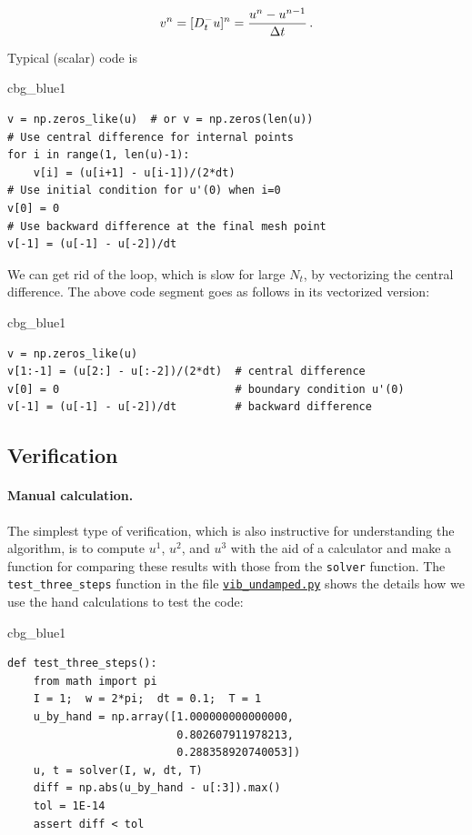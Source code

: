 \documentclass[%
oneside,                 %
final,                   %
10pt]{article}
\newenvironment{_cod_tight}[1]{
   \def\FrameCommand{\colorbox{#1}}
   \FrameRule0.6pt\MakeFramed {\FrameRestore}\vskip3mm}
   {\vskip0mm\endMakeFramed}
\newenvironment{cod}[1]{
\bgroup\rmfamily
\fboxsep=0mm\relax
\begin{_cod_tight}{#1}
\list{}{\parsep=-2mm\parskip=0mm\topsep=0pt\leftmargin=2mm
\rightmargin=2\leftmargin\leftmargin=4pt\relax}
\item\relax}
{\endlist\end{_cod_tight}\egroup}
\begin{document}
\[ v^n=[D_t^-u]^n = \frac{u^{n} - u^{n-1}}{\Delta t}\tp\]

Typical (scalar) code is

\begin{cod}{cbg_blue1}\begin{Verbatim}[numbers=none,fontsize=\fontsize{9pt}{9pt},baselinestretch=0.95,xleftmargin=2mm]
v = np.zeros_like(u)  # or v = np.zeros(len(u))
# Use central difference for internal points
for i in range(1, len(u)-1):
    v[i] = (u[i+1] - u[i-1])/(2*dt)
# Use initial condition for u'(0) when i=0
v[0] = 0
# Use backward difference at the final mesh point
v[-1] = (u[-1] - u[-2])/dt
\end{Verbatim}
\end{cod}
\noindent
We can get rid of the loop, which is slow for large $N_t$, by
vectorizing the central difference. The above code segment
goes as follows in its vectorized version:

\begin{cod}{cbg_blue1}\begin{Verbatim}[numbers=none,fontsize=\fontsize{9pt}{9pt},baselinestretch=0.95,xleftmargin=2mm]
v = np.zeros_like(u)
v[1:-1] = (u[2:] - u[:-2])/(2*dt)  # central difference
v[0] = 0                           # boundary condition u'(0)
v[-1] = (u[-1] - u[-2])/dt         # backward difference
\end{Verbatim}
\end{cod}
\noindent


\subsection{Verification}
\label{vib:ode1:verify}

\paragraph{Manual calculation.}
The simplest type of verification, which is also instructive for understanding
the algorithm, is to compute $u^1$, $u^2$, and $u^3$
with the aid of a calculator
and make a function for comparing these results with those from the \texttt{solver}
function. The \Verb!test_three_steps! function in
the file \href{{http://tinyurl.com/nm5587k/vib/vib_undamped.py}}{\nolinkurl{vib_undamped.py}}
shows the details how we use the hand calculations to test the code:

\begin{cod}{cbg_blue1}\begin{Verbatim}[numbers=none,fontsize=\fontsize{9pt}{9pt},baselinestretch=0.95,xleftmargin=2mm]
def test_three_steps():
    from math import pi
    I = 1;  w = 2*pi;  dt = 0.1;  T = 1
    u_by_hand = np.array([1.000000000000000,
                          0.802607911978213,
                          0.288358920740053])
    u, t = solver(I, w, dt, T)
    diff = np.abs(u_by_hand - u[:3]).max()
    tol = 1E-14
    assert diff < tol
\end{Verbatim}
\end{cod}
\noindent
\end{document}
